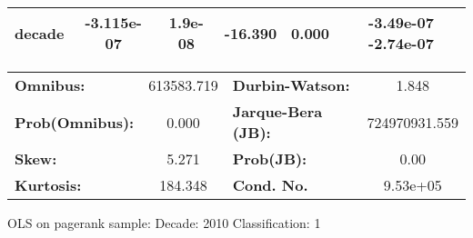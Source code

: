 \begin{center}
\begin{tabular}{lccccc}
\textbf{decade}             &   -3.115e-07  &      1.9e-08     &   -16.390  &         0.000        &     -3.49e-07 -2.74e-07       \\
\bottomrule
\end{tabular}
\begin{tabular}{lclc}
\textbf{Omnibus:}       & 613583.719 & \textbf{  Durbin-Watson:     } &       1.848    \\
\textbf{Prob(Omnibus):} &    0.000   & \textbf{  Jarque-Bera (JB):  } & 724970931.559  \\
\textbf{Skew:}          &    5.271   & \textbf{  Prob(JB):          } &        0.00    \\
\textbf{Kurtosis:}      &  184.348   & \textbf{  Cond. No.          } &    9.53e+05    \\
\bottomrule
\end{tabular}
\end{center}
\break
OLS on pagerank sample: Decade: 2010 Classification: 1
